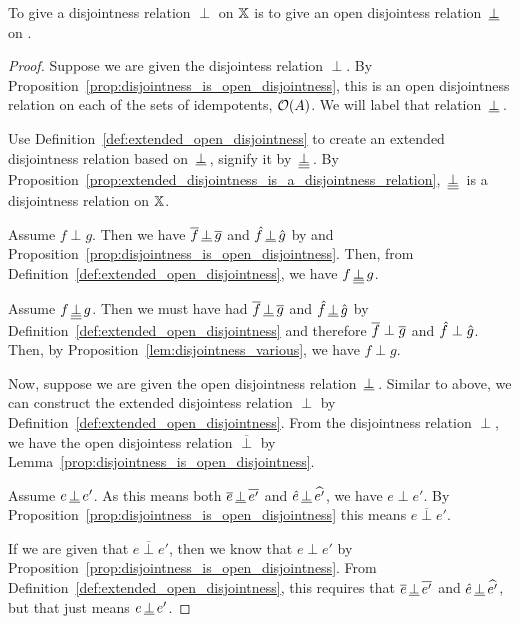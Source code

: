 \begin{theorem}\label{thm:open_disjointness_is_disjointness}
   To give a disjointness relation $\perp$ on $\mathbb{X}$ is to give an open disjointess relation
   $\,\underline{\perp}\,$ on \X.
\end{theorem}
\begin{proof}
  Suppose we are given the disjointess relation $\perp$. By
  Proposition~\ref{prop:disjointness_is_open_disjointness}, this is an open disjointness relation
  on each of the sets of idempotents, $\mathcal{O}({A})$. We will label that relation $\,\underline{\perp}\,$.

  Use Definition~\ref{def:extended_open_disjointness} to create an extended
  disjointness relation based on $\,\underline{\perp}\,$, signify it by $\,\underline{\underline{\perp}}\,$.
  By Proposition~\ref{prop:extended_disjointness_is_a_disjointness_relation}, $\,\underline{\underline{\perp}}\,$ is
  a disjointness relation on $\mathbb{X}$.

  Assume $f\perp g$. Then we have $\overline{f}\,\underline{\perp}\,\overline{g}$ and $\hat{f}\,\underline{\perp}\,\hat{g}$ by
   and Proposition~\ref{prop:disjointness_is_open_disjointness}. Then, from
  Definition~\ref{def:extended_open_disjointness}, we have $f \,\underline{\underline{\perp}}\, g$.

  Assume $f \,\underline{\underline{\perp}}\, g$. Then we must have had $\overline{f}\,\underline{\perp}\,\overline{g}$ and $\hat{f}\,\underline{\perp}\,\hat{g}$
  by Definition~\ref{def:extended_open_disjointness} and therefore $\overline{f}\perp\overline{g}$ and
  $\hat{f}\perp\hat{g}$. Then, by Proposition~\ref{lem:disjointness_various}, we have $f \perp g$.


  Now, suppose we are given the open disjointness relation $\,\underline{\perp}\,$. Similar to above, we can
  construct the extended disjointess relation $\perp$ by
  Definition~\ref{def:extended_open_disjointness}. From the disjointness relation $\perp$, we have
  the open disjointess relation $\overline{\perp}$ by
  Lemma~\ref{prop:disjointness_is_open_disjointness}.

  Assume $e \,\underline{\perp}\, e'$. As this means both $\overline{e} \,\underline{\perp}\, \overline{e'}$ and
  $\hat{e} \,\underline{\perp}\, \widehat{e'}$, we have $e \perp e'$. By
  Proposition~\ref{prop:disjointness_is_open_disjointness} this means $e \overline{\perp} e'$.

  If we are given that $e \overline{\perp} e'$, then we know that $e \perp e'$ by
  Proposition~\ref{prop:disjointness_is_open_disjointness}. From
  Definition~\ref{def:extended_open_disjointness}, this requires that $\overline{e} \,\underline{\perp}\, \overline{e'}$
  and $\hat{e} \,\underline{\perp}\, \widehat{e'}$, but that just means $e \,\underline{\perp}\, e'$.
\end{proof}

